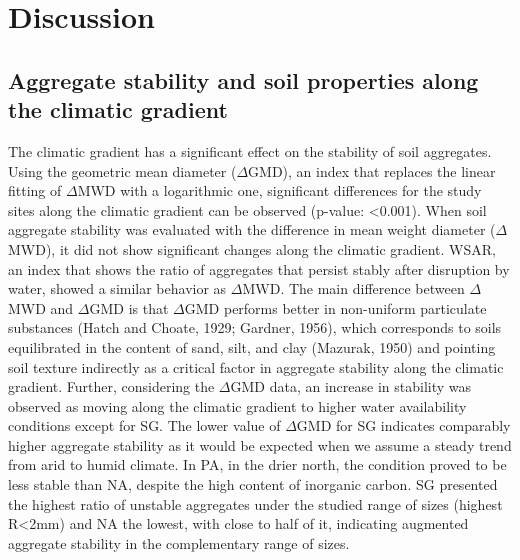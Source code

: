 \section{Discussion}

\subsection{Aggregate stability and soil properties along the climatic gradient}

The climatic gradient has a significant effect on the stability of soil aggregates. Using the geometric mean diameter ($\Delta$GMD), an index that replaces the linear fitting of $\Delta$MWD with a logarithmic one, significant differences for the study sites along the climatic gradient can be observed (p-value: <0.001). When soil aggregate stability was evaluated with the difference in mean weight diameter ($\Delta$MWD), it did not show significant changes along the climatic gradient. WSAR, an index that shows the ratio of aggregates that persist stably after disruption by water, showed a similar behavior as $\Delta$MWD. The main difference between $\Delta$MWD and $\Delta$GMD is that $\Delta$GMD performs better in non-uniform particulate substances (Hatch and Choate, 1929; Gardner, 1956), which corresponds to soils equilibrated in the content of sand, silt, and clay (Mazurak, 1950) and pointing soil texture indirectly as a critical factor in aggregate stability along the climatic gradient. Further, considering the $\Delta$GMD data, an increase in stability was observed as moving along the climatic gradient to higher water availability conditions except for SG. The lower value of $\Delta$GMD for SG indicates comparably higher aggregate stability as it would be expected when we assume a steady trend from arid to humid climate. In PA, in the drier north, the condition proved to be less stable than NA, despite the high content of inorganic carbon. SG presented the highest ratio of unstable aggregates under the studied range of sizes (highest R<2mm) and NA the lowest, with close to half of it, indicating augmented aggregate stability in the complementary range of sizes.

